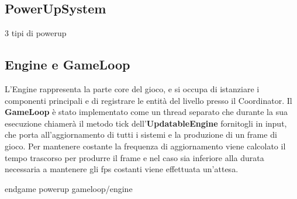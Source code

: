 \subsection{PowerUpSystem}

3 tipi di powerup 
\subsection{Engine e GameLoop}
L'Engine rappresenta la parte core del gioco, e si occupa di istanziare i componenti principali e di registrare le entità del livello presso il Coordinator.
Il \textbf{GameLoop} è stato implementato come un thread separato che durante la sua esecuzione chiamerà il metodo tick dell'\textbf{UpdatableEngine} fornitogli in input, che porta all'aggiornamento di tutti i sistemi e la produzione di un frame di gioco. Per mantenere costante la frequenza di aggiornamento viene calcolato il tempo trascorso per produrre il frame e nel caso sia inferiore alla durata necessaria a mantenere gli fps costanti viene effettuata un'attesa.

endgame
powerup
gameloop/engine